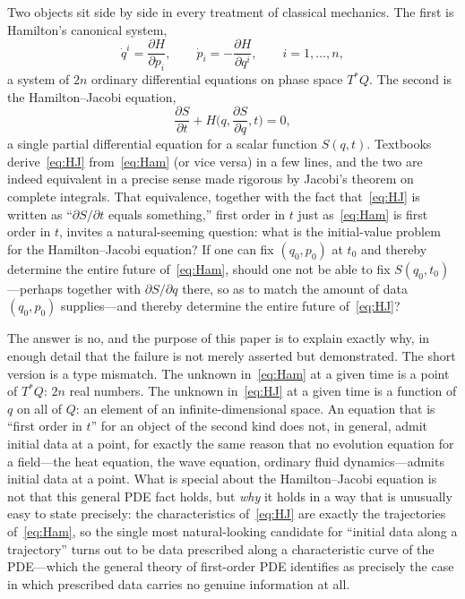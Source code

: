 \documentclass[11pt]{article}
\newcommand{\dd}[2]{\frac{\partial #1}{\partial #2}}
\begin{document}
Two objects sit side by side in every treatment of classical mechanics. The first is Hamilton's canonical system,
\begin{equation}
\label{eq:Ham}
\dot q^i = \dd{H}{p_i}, \qquad \dot p_i = -\dd{H}{q^i}, \qquad i=1,\dots,n,
\end{equation}
a system of $2n$ ordinary differential equations on phase space $T^*Q$. The second is the Hamilton--Jacobi equation,
\begin{equation}
\label{eq:HJ}
\dd{S}{t} + H\Big(q,\dd{S}{q},t\Big) = 0,
\end{equation}
a single partial differential equation for a scalar function $S(q,t)$. Textbooks derive~\eqref{eq:HJ} from~\eqref{eq:Ham} (or vice versa) in a few lines, and the two are indeed equivalent in a precise sense made rigorous by Jacobi's theorem on complete integrals. That equivalence, together with the fact that~\eqref{eq:HJ} is written as ``$\partial S/\partial t$ equals something,'' first order in $t$ just as~\eqref{eq:Ham} is first order in $t$, invites a natural-seeming question: what is the initial-value problem for the Hamilton--Jacobi equation? If one can fix $(q_0,p_0)$ at $t_0$ and thereby determine the entire future of~\eqref{eq:Ham}, should one not be able to fix $S(q_0,t_0)$---perhaps together with $\partial S/\partial q$ there, so as to match the amount of data $(q_0,p_0)$ supplies---and thereby determine the entire future of~\eqref{eq:HJ}?

The answer is no, and the purpose of this paper is to explain exactly why, in enough detail that the failure is not merely asserted but demonstrated. The short version is a type mismatch. The unknown in~\eqref{eq:Ham} at a given time is a point of $T^*Q$: $2n$ real numbers. The unknown in~\eqref{eq:HJ} at a given time is a function of $q$ on all of $Q$: an element of an infinite-dimensional space. An equation that is ``first order in $t$'' for an object of the second kind does not, in general, admit initial data at a point, for exactly the same reason that no evolution equation for a field---the heat equation, the wave equation, ordinary fluid dynamics---admits initial data at a point. What is special about the Hamilton--Jacobi equation is not that this general PDE fact holds, but \emph{why} it holds in a way that is unusually easy to state precisely: the characteristics of~\eqref{eq:HJ} are exactly the trajectories of~\eqref{eq:Ham}, so the single most natural-looking candidate for ``initial data along a trajectory'' turns out to be data prescribed along a characteristic curve of the PDE---which the general theory of first-order PDE identifies as precisely the case in which prescribed data carries no genuine information at all.
\end{document}
